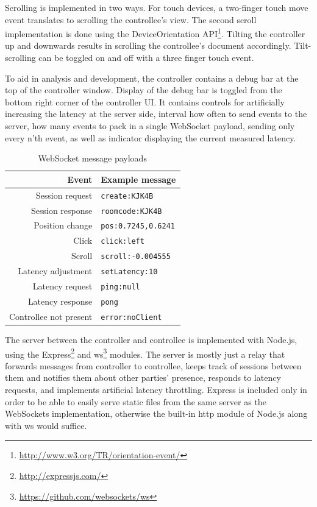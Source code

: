 \documentclass[a4paper,english,twocolumn]{article}
\begin{document}
Scrolling is implemented in two ways. For touch devices, a two-finger
touch move event translates to scrolling the controllee's view. The
second scroll implementation is done using the DeviceOrientation
API\footnote{\url{http://www.w3.org/TR/orientation-event/}}. Tilting
the controller up and downwards results in scrolling the controllee's
document accordingly. Tilt-scrolling can be toggled on and off with a
three finger touch event.

To aid in analysis and development, the controller contains a debug
bar at the top of the controller window. Display of the debug bar is
toggled from the bottom right corner of the controller UI. It contains
controls for artificially increasing the latency at the server side,
interval how often to send events to the server, how many events to
pack in a single WebSocket payload, sending only every n'th event, as
well as indicator displaying the current measured latency.

\begin{table} \centering
  \begin{tabular}{rl}
    Event & Example message \\
    \hline
    Session request & \verb!create:KJK4B! \\
    Session response & \verb!roomcode:KJK4B! \\
    Position change & \verb!pos:0.7245,0.6241! \\
    Click & \verb!click:left! \\
    Scroll & \verb!scroll:-0.004555! \\
    Latency adjustment & \verb!setLatency:10! \\
    Latency request & \verb!ping:null! \\
    Latency response & \verb!pong! \\
    Controllee not present & \verb!error:noClient! \\
    \hline
  \end{tabular}
  \caption{WebSocket message payloads}
  \label{table:messages}
\end{table}

The server between the controller and controllee is implemented with
Node.js, using the Express\footnote{\url{http://expressjs.com/}} and
ws\footnote{\url{https://github.com/websockets/ws}} modules. The
server is mostly just a relay that forwards messages from controller
to controllee, keeps track of sessions between them and notifies them
about other parties' presence, responds to latency requests, and
implements artificial latency throttling. Express is included only in
order to be able to easily serve static files from the same server as
the WebSockets implementation, otherwise the built-in http module of
Node.js along with ws would suffice.
\end{document}
